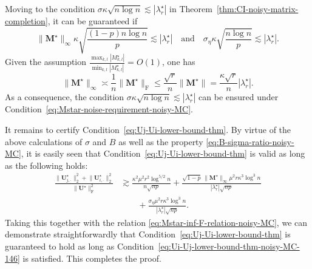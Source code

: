 Moving to the condition $\sigma \kappa\sqrt{n\log n}\lesssim |\lambda_{r}^{\star}|$ in Theorem~\ref{thm:CI-noisy-matrix-completion}, it can be guaranteed if
	\begin{equation*}
		\|\bm{M}^{\star}\|_{\infty}\kappa\sqrt{\frac{(1-p)n\log n}{p}}
		\lesssim|\lambda_{r}^{\star}| 
		\quad \text{and} \quad
		\sigma_{\eta}\kappa\sqrt{\frac{n\log n}{p}}\lesssim|\lambda_{r}^{\star}|.  
		\label{eq:Mstar-noise-requirement-noisy-MC-135}
	\end{equation*}
Given the assumption  $\frac{\max_{k,l}|M_{k,l}^{\star}|}{\min_{k,l}|M_{k,l}^{\star}|}=O(1)$, one has 
%
\begin{equation}
	\label{eq:Mstar-inf-F-relation-noisy-MC}
	\|\bm{M}^{\star}\|_{\infty} \asymp \frac{1}{n} \|\bm{M}^{\star}\|_{\mathrm{F}} 
	\leq \frac{\sqrt{r}}{n} \|\bm{M}^{\star}\| 
	= \frac{\kappa \sqrt{r}}{n} |\lambda_{r}^{\star}|. 
\end{equation}
%
As a consequence, the condition $\sigma \kappa\sqrt{n\log n}\lesssim |\lambda_{r}^{\star}|$ can be ensured under Condition~\eqref{eq:Mstar-noise-requirement-noisy-MC}. 
%


It remains to certify Condition~\eqref{eq:Uj-Ui-lower-bound-thm}. 
By virtue of the above calculations of $\sigma$ and $B$ as well as the property \eqref{eq:B-sigma-ratio-noisy-MC}, it is easily seen that Condition~\eqref{eq:Uj-Ui-lower-bound-thm} is valid as long as the following holds:
%
\begin{align*}
\frac{\big\|\bm{U}_{j,\cdot}^{\star}\big\|_{2}^{2}+\big\|\bm{U}_{i,\cdot}^{\star}\big\|_{2}^{2}}{\big\|\bm{U}^{\star}\big\|_{\mathrm{F}}^{2}} & \gtrsim\frac{\kappa^{2}\mu^{2}r^{2}\log^{5/2}n}{n\sqrt{np}}+\frac{\sqrt{1-p}\,\|\bm{M}^{\star}\|_{\infty}\mu^{2}r\kappa^{3}\log^{3}n}{|\lambda_{r}^{\star}|\sqrt{np}}\\
 & \qquad+\frac{\sigma_{\eta}\mu^{2}r\kappa^{3}\log^{3}n}{|\lambda_{r}^{\star}|\sqrt{np}}.
\end{align*}
%
Taking this together with the relation \eqref{eq:Mstar-inf-F-relation-noisy-MC}, 
we can demonstrate straightforwardly that Condition~\eqref{eq:Uj-Ui-lower-bound-thm} is guaranteed to hold as long as Condition~\eqref{eq:Ui-Uj-lower-bound-thm-noisy-MC-146} is satisfied. 
This completes the proof. 




